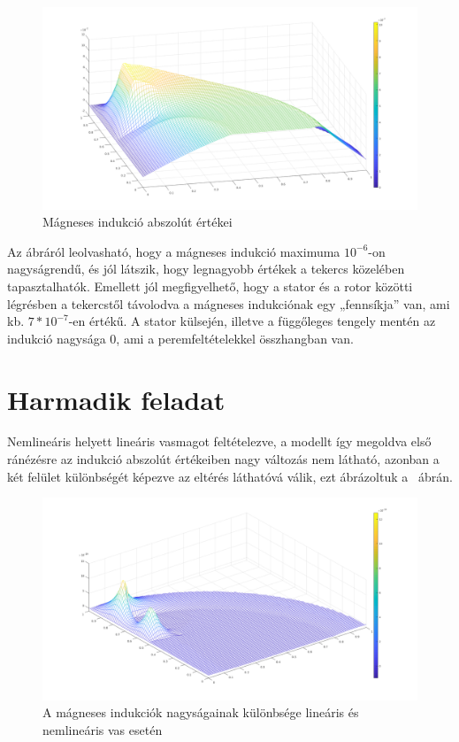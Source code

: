 \begin{figure}[!h]
	\centering
	\includegraphics[width=150mm, keepaspectratio]{figures/terek/normal_eloszlas}
	\caption{Mágneses indukció abszolút értékei}
	\label{fig:normaleloszlas}
\end{figure}


Az ábráról leolvasható, hogy a mágneses indukció maximuma  $ 10^{-6} $-on nagyságrendű, és jól látszik, hogy legnagyobb értékek a tekercs közelében tapasztalhatók. Emellett jól megfigyelhető, hogy a stator és a rotor közötti légrésben a tekercstől távolodva a mágneses indukciónak egy „fennsíkja” van, ami kb.  $ 7*10^{-7} $-en értékű. A stator külsején, illetve a függőleges tengely mentén az indukció nagysága 0, ami a peremfeltételekkel összhangban van.

\section{Harmadik feladat}
Nemlineáris helyett lineáris vasmagot feltételezve, a modellt így megoldva első ránézésre az indukció abszolút értékeiben nagy változás nem látható, azonban a két felület különbségét képezve az eltérés láthatóvá válik, ezt ábrázoltuk a ~ábrán.

\begin{figure}[!h]
	\centering
	\includegraphics[width=150mm, keepaspectratio]{figures/terek/kulonbseg}
	\caption{A mágneses indukciók nagyságainak különbsége lineáris és nemlineáris vas esetén}
	\label{fig:kulonbseg}
\end{figure}

